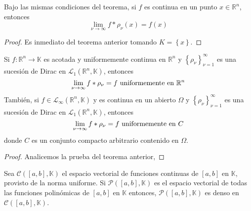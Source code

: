 \documentclass[12pt]{report}
\theoremstyle{largebreak}
\newcommand\cf[3]{\ensuremath{#1:#2\rightarrow#3}}
\begin{document}
    \begin{cor}
        Bajo las mismas condiciones del teorema, si $f$ es continua en un punto $x\in\mathbb{R}^n$, entonces
        \begin{equation*}
            \lim_{\nu\rightarrow\infty}f*\rho_\nu(x)=f(x)
        \end{equation*}
    \end{cor}

    \begin{proof}
        Es inmediato del teorema anterior tomando $K=\left\{x\right\}$.
    \end{proof}

    \begin{theor}
        Si $\cf{f}{\mathbb{R}^n}{\mathbb{K}}$ es acotada y uniformemente continua en $\mathbb{R}^n$ y $\left\{\rho_\nu \right\}_{\nu=1}^\infty$ es una sucesión de Dirac en $\mathcal{L}_1(\mathbb{R}^n,\mathbb{K})$, entonces
        \begin{equation*}
            \lim_{\nu\rightarrow\infty}f*\rho_\nu=f\textup{ uniformemente en }\mathbb{R}^n
        \end{equation*}
        También, si $f\in\mathcal{L}_\infty(\mathbb{R}^n,\mathbb{K})$ y es continua en un abierto $\Omega$ y $\left\{\rho_\nu \right\}_{\nu=1}^\infty$ es una sucesión de Dirac en $\mathcal{L}_1(\mathbb{R}^n,\mathbb{K})$, entonces
        \begin{equation*}
            \lim_{\nu\rightarrow\infty}f*\rho_\nu=f\textup{ uniformemente en }C
        \end{equation*}
        donde $C$ es un conjunto compacto arbitrario contenido en $\Omega$.
    \end{theor}

    \begin{proof}
        Analicemos la prueba del teorema anterior,
    \end{proof}

    \begin{theor}
        Sea $\mathcal{C}([a,b],\mathbb{K})$ el espacio vectorial de funciones continuas de $[a,b]$ en $\mathbb{K}$, provisto de la norma uniforme. Si $\mathcal{P}([a,b],\mathbb{K})$ es el espacio vectorial de todas las funciones polinómicas de $[a,b]$ en $\mathbb{K}$ entonces, $\mathcal{P}([a,b],\mathbb{K})$ es denso en $\mathcal{C}([a,b],\mathbb{K})$.
    \end{theor}
\end{document}
